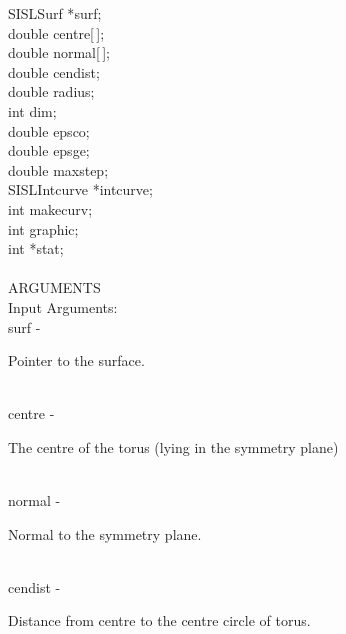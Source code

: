                 \>\>    SISLSurf        \>      *{\fov surf};\\
                \>\>    double  \>      {\fov centre}[\,];\\
                \>\>    double  \>      {\fov normal}[\,];\\
                \>\>    double  \>      {\fov cendist};\\
                \>\>    double  \>      {\fov radius};\\
                \>\>    int     \>      {\fov dim};\\
                \>\>    double  \>      {\fov epsco};\\
                \>\>    double  \>      {\fov epsge};\\
                \>\>    double  \>      {\fov maxstep};\\
                \>\>    SISLIntcurve\>  *{\fov intcurve};\\
                \>\>    int     \>      {\fov makecurv};\\
                \>\>    int     \>      {\fov graphic};\\
                \>\>    int     \>      *{\fov stat};\\
\\
ARGUMENTS\\
        \>Input Arguments:\\
        \>\>    {\fov surf}\> - \>      \begin{minipg2}
                                Pointer to the surface.
                                \end{minipg2}\\
        \>\>    {\fov centre}\> - \>    \begin{minipg2}
                                The centre of the torus (lying in the symmetry
                                plane)
                                \end{minipg2}\\
        \>\>    {\fov normal}\> - \>    \begin{minipg2}
                                Normal to the symmetry plane.
                                \end{minipg2}\\
        \>\>    {\fov cendist}\> - \>   \begin{minipg2}
                                Distance from centre to the centre circle of torus.
                                \end{minipg2} \\
